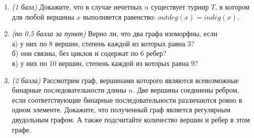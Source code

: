 \documentclass{article}
\begin{document}
\begin{enumerate}
    \item \textit{(1 балл)} Докажите, что в случае нечетных $n$ существует турнир $T$, в котором для любой вершины $x$ выполняется равенство: $outdeg(x) = indeg(x)$.
    
    \item \textit{(по 0,5 балла за пункт)} Верно ли, что два графа изоморфны, если\\
    а) у них по 8 вершин, степень каждой из которых равна 3?\\
    б) они связны, без циклов и содержат по 6 ребер?\\
    в) у них по 10 вершин, степень каждой из которых равна 9?
    
    \item \textit{(2 балла)} Рассмотрим граф, вершинами которого являются всевозможные бинарные последовательности длины $n$. Две вершины соединены ребром, если соответствующие бинарные последовательности различаются ровно в одном элементе. Докажите, что полученный граф является регулярным двудольным графом. А также подсчитайте количество вершин и ребер в этом графе.
    
\end{enumerate}
\end{document}
